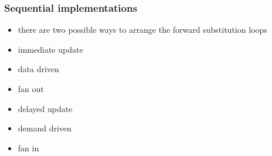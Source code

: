 \begin{frame}[fragile]
%
  \frametitle{Sequential implementations}
%
  \begin{itemize}
  \item there are two possible ways to arrange the forward substitution loops 
  \end{itemize}
%
  \begin{minipage}{.45\linewidth}
    \small
    \begin{algorithm}[H]
%
      \DontPrintSemicolon
      \NoCaptionOfAlgo
%
%
    \end{algorithm}
%
    \begin{itemize}
    \item immediate update
    \item data driven
    \item fan out
    \end{itemize}
%
  \end{minipage}
%
  \hfill
%
  \begin{minipage}{.45\linewidth}
    \small
    \begin{algorithm}[H]
%
      \DontPrintSemicolon
      \NoCaptionOfAlgo
%
%
    \end{algorithm}
%
    \begin{itemize}
    \item delayed update
    \item demand driven
    \item fan in
    \end{itemize}
%
  \end{minipage}
%
\end{frame}

